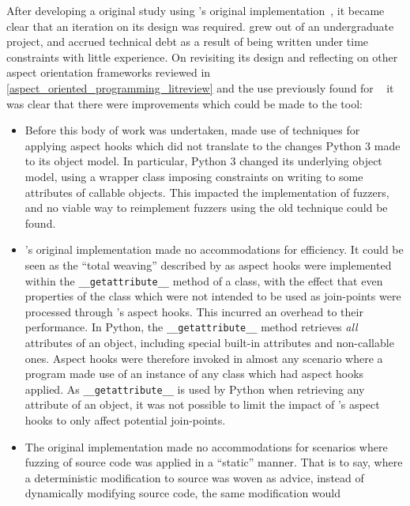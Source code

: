 After developing a original study using \pdsf{}'s original
implementation~\cite{wallis2018caise}, it became clear that an iteration on its
design was required. \pdsf{} grew out of an undergraduate project, and accrued
technical debt as a result of being written under time constraints with little
experience. On revisiting its design and reflecting on other aspect orientation
frameworks reviewed in  
\cref{aspect_oriented_programming_litreview} and the use previously found for
\pdsf{}~\cite{wallis2018caise,wallis2018genetic} it was clear that there were
improvements which could be made to the tool:

\begin{itemize}
    \item Before this body of work was undertaken, \pdsf made use of techniques
      for applying aspect hooks which did not translate to the changes Python 3
      made to its object model. In particular, Python 3 changed its underlying
      object model, using a wrapper class imposing constraints on writing to
      some attributes of callable objects. This impacted the implementation of
      fuzzers, and no viable way to reimplement fuzzers using the old technique
      could be found.
    \item \pdsf{}'s original implementation made no accommodations for
      efficiency. It could be seen as the ``total weaving'' described by
      \citet{dynamicAOchitchyan} as aspect hooks were implemented within the
      \lstinline{__getattribute__} method of a class, with the effect that even
      properties of the class which were not intended to be used as join-points
      were processed through \pdsf{}'s aspect hooks. This incurred an overhead
      to their performance. In Python, the \lstinline{__getattribute__} method
      retrieves \emph{all} attributes of an object, including special built-in
      attributes and non-callable ones. Aspect hooks were therefore invoked in
      almost any scenario where a program made use of an instance of any class
      which had aspect hooks applied. As \lstinline{__getattribute__} is used by
      Python when retrieving any attribute of an object, it was not possible to
      limit the impact of \pdsf{}'s aspect hooks to only affect potential
      join-points.
    \item The original \pdsf implementation made no accommodations for scenarios
      where fuzzing of source code was applied in a ``static'' manner. That is
      to say, where a deterministic modification to source was woven as advice,
      instead of dynamically modifying source code, the same modification would

\end{itemize}
